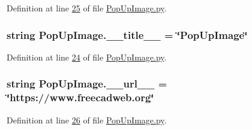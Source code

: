 Definition at line \hyperlink{PopUpImage_8py_source_l00025}{25} of file \hyperlink{PopUpImage_8py_source}{Pop\+Up\+Image.\+py}.

\subsubsection[{\texorpdfstring{\+\_\+\+\_\+title\+\_\+\+\_\+}{__title__}}]{\setlength{\rightskip}{0pt plus 5cm}string Pop\+Up\+Image.\+\_\+\+\_\+title\+\_\+\+\_\+ = \char`\"{}Pop\+Up\+Image\char`\"{}\hspace{0.3cm}{\ttfamily [private]}}\hypertarget{namespacePopUpImage_a4141c27e055e2d28a4b83ce4a05c56f1}{}\label{namespacePopUpImage_a4141c27e055e2d28a4b83ce4a05c56f1}


Definition at line \hyperlink{PopUpImage_8py_source_l00024}{24} of file \hyperlink{PopUpImage_8py_source}{Pop\+Up\+Image.\+py}.

\subsubsection[{\texorpdfstring{\+\_\+\+\_\+url\+\_\+\+\_\+}{__url__}}]{\setlength{\rightskip}{0pt plus 5cm}string Pop\+Up\+Image.\+\_\+\+\_\+url\+\_\+\+\_\+ = \char`\"{}https\+://www.\+freecadweb.\+org\char`\"{}\hspace{0.3cm}{\ttfamily [private]}}\hypertarget{namespacePopUpImage_a5c155cc535acd99cd7c1179185e9c857}{}\label{namespacePopUpImage_a5c155cc535acd99cd7c1179185e9c857}


Definition at line \hyperlink{PopUpImage_8py_source_l00026}{26} of file \hyperlink{PopUpImage_8py_source}{Pop\+Up\+Image.\+py}.

